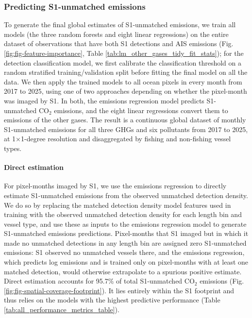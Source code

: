 \documentclass[lineno,pdflatex,sn-nature]{sn-jnl}
\begin{document}

\FloatBarrier

\subsubsection{Predicting S1-unmatched emissions}

To generate the final global estimates of S1-unmatched emissions, we train all models (the three random forests and eight linear regressions) on the entire dataset of observations that have both S1 detections and AIS emissions (Fig. \ref{fig:fig-feature-importance}, Table \ref{tab:lm_other_gases_tidy_fit_stats}); for the detection classification model, we first calibrate the classification threshold on a random stratified training/validation split before fitting the final model on all the data. We then apply the trained models to all ocean pixels in every month from 2017 to 2025, using one of two approaches depending on whether the pixel-month was imaged by S1. In both, the emissions regression model predicts S1-unmatched CO$_2$ emissions, and the eight linear regressions convert them to emissions of the other gases. The result is a continuous global dataset of monthly S1-unmatched emissions for all three GHGs and six pollutants from 2017 to 2025, at 1×1-degree resolution and disaggregated by fishing and non-fishing vessel types.

\paragraph{Direct estimation}

For pixel-months imaged by S1, we use the emissions regression to directly estimate S1-unmatched emissions from the observed unmatched detection density. We do so by replacing the matched detection density model features used in training with the observed unmatched detection density for each length bin and vessel type, and use these as inputs to the emissions regression model to generate S1-unmatched emissions predictions. Pixel-months that S1 imaged but in which it made no unmatched detections in any length bin are assigned zero S1-unmatched emissions: S1 observed no unmatched vessels there, and the emissions regression, which predicts log emissions and is trained only on pixel-months with at least one matched detection, would otherwise extrapolate to a spurious positive estimate. Direct estimation accounts for 95.7\% of total S1-unmatched CO$_2$ emissions (Fig. \ref{fig:fig-spatial-coverage-footprint}). It lies entirely within the S1 footprint and thus relies on the models with the highest predictive performance (Table \ref{tab:all_performance_metrics_table}).
\end{document}
